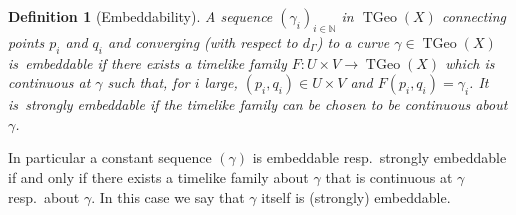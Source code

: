 \documentclass[a4paper,11pt]{article}
\numberwithin{equation}{section}
\theoremstyle{plain}
\newtheorem{Definition}{Definition}[section]
\theoremstyle{definition}
\newcommand{\N}{\mathbb N}
\DeclareMathOperator{\TGeo}{TGeo}
\begin{document}
\begin{Definition}[Embeddability] A sequence $(\gamma_i)_{i\in \N}$ in $\TGeo(X)$ connecting points $p_i$ and $q_i$ and converging (with respect to $d_\Gamma$) to a curve $\gamma\in \TGeo(X)$ is~\emph{embeddable\/} if there exists a timelike family $F \colon U\times V \to \TGeo(X)$ which is continuous at $\gamma$ such that, for $i$ large, $(p_i,q_i)\in U\times V$ and $F(p_i,q_i) = \gamma_i$. It is~\emph{strongly embeddable\/} if the timelike family can be chosen to be continuous about $\gamma$.
\end{Definition}
In particular a constant sequence $(\gamma)$ is embeddable resp.\ strongly embeddable if and only if there exists a timelike family about $\gamma$ that is continuous at $\gamma$ resp.\ about $\gamma$.
In this case we say that $\gamma$ itself is (strongly) embeddable. 
\end{document}
